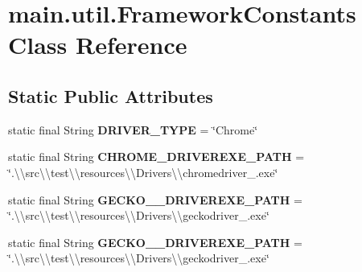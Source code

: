 \hypertarget{classmain_1_1util_1_1_framework_constants}{}\section{main.\+util.\+Framework\+Constants Class Reference}
\label{classmain_1_1util_1_1_framework_constants}
\subsection*{Static Public Attributes}
\begin{DoxyCompactItemize}
\item 
\mbox{\label{classmain_1_1util_1_1_framework_constants_aec4e078646cebcd7f5730916bbcb7261}} 
static final String {\bfseries D\+R\+I\+V\+E\+R\+\_\+\+T\+Y\+PE} = \char`\"{}Chrome\char`\"{}
\item 
\mbox{\label{classmain_1_1util_1_1_framework_constants_a883117dd023b6a5f005151f6bcfc7d48}} 
static final String {\bfseries C\+H\+R\+O\+M\+E\+\_\+\+D\+R\+I\+V\+E\+R\+E\+X\+E\+\_\+\+P\+A\+TH} = \char`\"{}.\textbackslash{}\textbackslash{}src\textbackslash{}\textbackslash{}test\textbackslash{}\textbackslash{}resources\textbackslash{}\textbackslash{}\+Drivers\textbackslash{}\textbackslash{}chromedriver\+\_.\+exe\char`\"{}
\item 
\mbox{\label{classmain_1_1util_1_1_framework_constants_a977fc0daaebe258859a930c0148d245c}} 
static final String {\bfseries G\+E\+C\+K\+O\+\_\+\_\+\+D\+R\+I\+V\+E\+R\+E\+X\+E\+\_\+\+P\+A\+TH} = \char`\"{}.\textbackslash{}\textbackslash{}src\textbackslash{}\textbackslash{}test\textbackslash{}\textbackslash{}resources\textbackslash{}\textbackslash{}\+Drivers\textbackslash{}\textbackslash{}geckodriver\+\_.\+exe\char`\"{}
\item 
\mbox{\label{classmain_1_1util_1_1_framework_constants_a7e1645c395a392629e671eb24855680c}} 
static final String {\bfseries G\+E\+C\+K\+O\+\_\+\_\+\+D\+R\+I\+V\+E\+R\+E\+X\+E\+\_\+\+P\+A\+TH} = \char`\"{}.\textbackslash{}\textbackslash{}src\textbackslash{}\textbackslash{}test\textbackslash{}\textbackslash{}resources\textbackslash{}\textbackslash{}\+Drivers\textbackslash{}\textbackslash{}geckodriver\+\_.\+exe\char`\"{}

\end{DoxyCompactItemize}

